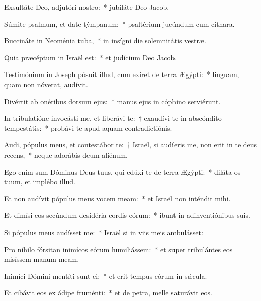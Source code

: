 \item Exsultáte Deo, adjutóri nostro:~* jubiláte Deo Jacob.

\item Súmite psalmum, et date týmpanum:~* psaltérium jucúndum cum cíthara.

\item Buccináte in Neoménia tuba,~* in insígni die solemnitátis vestræ.

\item Quia præcéptum in Israël est:~* et judícium Deo Jacob.

\item Testimónium in Joseph pósuit illud, cum exíret de terra Ægýpti:~* linguam, quam non nóverat, audívit.

\item Divértit ab onéribus dorsum ejus:~* manus ejus in cóphino serviérunt.

\item In tribulatióne invocásti me, et liberávi te:~† exaudívi te in abscóndito tempestátis:~* probávi te apud aquam contradictiónis.

\item Audi, pópulus meus, et contestábor te:~† Israël, si audíeris me, non erit in te deus recens,~* neque adorábis deum aliénum.

\item Ego enim sum Dóminus Deus tuus, qui edúxi te de terra Ægýpti:~* diláta os tuum, et implébo illud.

\item Et non audívit pópulus meus vocem meam:~* et Israël non inténdit mihi.

\item Et dimísi eos secúndum desidéria cordis eórum:~* ibunt in adinventiónibus suis.

\item Si pópulus meus audísset me:~* Israël si in viis meis ambulásset:

\item Pro níhilo fórsitan inimícos eórum humiliássem:~* et super tribulántes eos misíssem manum meam.

\item Inimíci Dómini mentíti sunt ei:~* et erit tempus eórum in sǽcula.

\item Et cibávit eos ex ádipe fruménti:~* et de petra, melle saturávit eos.
